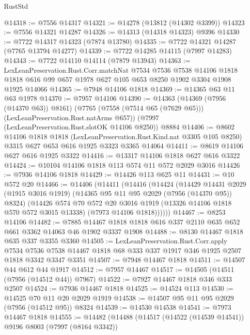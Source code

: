 \begin{lexlean}{RustStd}
\begin{coremodule}
@14318 := @7556 @14317
@14321 := @14278 (@13812 (@14302 @3399))
@14323 := @7556 @14321 @14287
@14326 := @14313 (@14318 @14323) @9396
@14330 := @7722 @14317 @14323 (@7874 @13780)
@14335 := @7722 @14321 @14287 (@7765 @13794 @14277)
@14339 := @7722 @14285 @14115 (@7997 @14283)
@14343 := @7722 @14110 @14114 (@7879 @13943)
@14363 := LexLeanPreservation.Rust.Corr.matchNat
    @7534
    @7536
    @7538
    @14106
    @1818
    @1818
    @616
    @99
    @657
    @1978
    @627
    @105
    @653
    @8250
    @1902
    @3304
    @1908
    @1925
    @14066
@14365 := @7948 @14106 @1818
@14369 := @14365 @63 @11 @63 @1978
@14370 := @7957 @14106
@14390 := @14363
    (@14369 (@7956 (@14370 @63)) @8161)
    (@7765 (@7558 (@7514 @65 (@7629 @65))) (LexLeanPreservation.Rust.natArms @657))
    (@7997 (LexLeanPreservation.Rust.slotOK @14106 @8250))
    @8884
@14406 := @8602
    @14106
    @1818
    @1818
    (LexLeanPreservation.Rust.Kind.nat @3305 @105 @8250)
    @3315
    @627
    @653
    @616
    @1925
    @3323
    @3365
    @14064
@14411 := @8619 @14106 @627 @616 @1925 @3322
@14416 := @13317 @14106 @1818 @627 @616 @3322
@14424 := @10104 @14106 @1818 @113 @574 @11 @572 @2029 @3016
@14426 := @7936 @14106 @1818
@14429 := @14426 @113 @625 @11
@14431 := @10 @572 @20
@14466 := @14406
    (@14411
      (@14416
        (@14424
          (@14429
            @14431
            @2029
            (@1915 @3016 @1919)
            (@14365 @95 @11 @95 @2029 (@7956 (@14370 @95)) @8324)
            (@14426
              @574
              @70
              @572
              @20
              @3016
              @1919
              (@13326 @14106 @1818 @570 @572 @3015 @13338)
              (@7973 @14106 @1818))))))
@14467 := @8253 @14106
@14482 := @7885 @14467 @1818 @1818 @616 @337 @2110 @635 @652 @661 @3362 @14063 @46 @1902 @3337 @1908
@14488 := @8130 @14467 @1818 @635 @337 @3355 @3360
@14505 := LexLeanPreservation.Rust.Corr.apply
    @7534
    @7536
    @7538
    @14467
    @1818
    @68
    @333
    @337
    @1917
    @346
    @1925
    @2507
    @1818
    @3342
    @3347
    @3351
@14507 := @7948 @14467 @1818
@14511 := @14507 @44 @612 @44 @1917
@14512 := @7957 @14467
@14517 := @14505 (@14511 (@7956 (@14512 @44)) @7967)
@14522 := @7927 @14467 @1818 @346 @333 @2507
@14524 := @7936 @14467 @1818
@14525 := @14524 @113
@14530 := @14525 @70 @11 @20 @2029 @1919
@14538 := @14507 @95 @11 @95 @2029 (@7956 (@14512 @95)) @8324
@14539 := @14530 @14538
@14541 := @7973 @14467 @1818
@14555 := @14482
    (@14488
      (@14517
        (@14522 (@14539 @14541))
        @9196
        @8003
        (@7997 (@8164 @3342))

\end{coremodule}
\end{lexlean}
